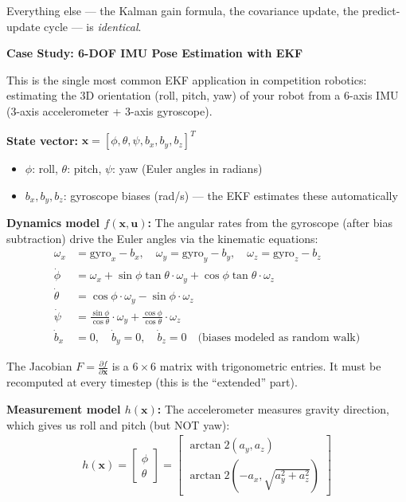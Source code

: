Everything else --- the Kalman gain formula, the covariance update, the predict-update cycle --- is \textit{identical}.

\vspace{0.5em}
\begin{mdframed}[linewidth=1pt, innertopmargin=10pt, innerbottommargin=10pt]
\textbf{Case Study: 6-DOF IMU Pose Estimation with EKF}

\vspace{0.3em}
This is the single most common EKF application in competition robotics: estimating the 3D orientation (roll, pitch, yaw) of your robot from a 6-axis IMU (3-axis accelerometer + 3-axis gyroscope).

\textbf{State vector:} $\mathbf{x} = [\phi, \theta, \psi, b_x, b_y, b_z]^T$
\begin{itemize}[nosep]
    \item $\phi$: roll, $\theta$: pitch, $\psi$: yaw (Euler angles in radians)
    \item $b_x, b_y, b_z$: gyroscope biases (rad/s) --- the EKF estimates these automatically
\end{itemize}

\textbf{Dynamics model $f(\mathbf{x}, \mathbf{u})$:} The angular rates from the gyroscope (after bias subtraction) drive the Euler angles via the kinematic equations:
\begin{align}
\omega_x &= \text{gyro}_x - b_x, \quad \omega_y = \text{gyro}_y - b_y, \quad \omega_z = \text{gyro}_z - b_z \\[3pt]
\dot{\phi} &= \omega_x + \sin\phi \tan\theta \cdot \omega_y + \cos\phi \tan\theta \cdot \omega_z \\
\dot{\theta} &= \cos\phi \cdot \omega_y - \sin\phi \cdot \omega_z \\
\dot{\psi} &= \frac{\sin\phi}{\cos\theta} \cdot \omega_y + \frac{\cos\phi}{\cos\theta} \cdot \omega_z \\[3pt]
\dot{b}_x &= 0, \quad \dot{b}_y = 0, \quad \dot{b}_z = 0 \quad \text{(biases modeled as random walk)}
\end{align}

The Jacobian $F = \frac{\partial f}{\partial \mathbf{x}}$ is a $6 \times 6$ matrix with trigonometric entries. It must be recomputed at every timestep (this is the ``extended'' part).

\textbf{Measurement model $h(\mathbf{x})$:} The accelerometer measures gravity direction, which gives us roll and pitch (but NOT yaw):
\begin{align}
h(\mathbf{x}) = \begin{bmatrix} \phi \\ \theta \end{bmatrix} = \begin{bmatrix} \arctan2(a_y, a_z) \\ \arctan2(-a_x, \sqrt{a_y^2 + a_z^2}) \end{bmatrix}
\end{align}


\end{mdframed}
